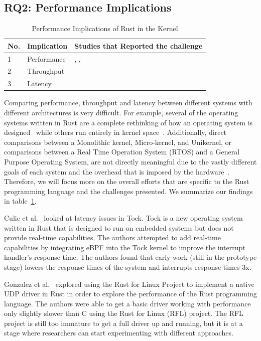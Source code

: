 \documentclass[sigconf]{acmart}
\begin{document}
\subsection{RQ2: Performance Implications}

\begin{table}
    \begin{tabular}{||l|l|l||}
    \hline
    No. & Implication & Studies that Reported the challenge\\
    \hline\hline
    1 & Performance & \cite{Gonzalez2023-ek}, \cite{Li2024-be}, \cite{Ma2023-ef}\\
    2 & Throughput & \cite{Gonzalez2023-ek}\\
    3 & Latency & \cite{Culic2022-bk} \\
    \hline
  \end{tabular}
  \caption{Performance Implications of Rust in the Kernel}
    \label{tab:RQ2}
\end{table}

Comparing performance, throughput and latency between different systems with different architectures is very difficult. For
example, several of the operating systems written in Rust are a complete rethinking of
how an operating system is designed~\cite{Boos2020-zh} while others run entirely in kernel space~\cite{Lankes2019-cm}. Additionally, direct comparisons between a Monolithic kernel, Micro-kernel, and Unikernel, or
comparisons between a Real Time Operation System (RTOS) and a General Purpose Operating System, are
not directly meaningful due to the vastly different goals of each system and the overhead that is imposed by the hardware~\cite{Arnott2012-fl}. Therefore, we will focus more on the overall efforts that are specific to the Rust programming language and the challenges
presented. We summarize our findings in table~\ref{tab:RQ2}.

Culic et al.~\cite{Culic2022-bk} looked at latency issues in Tock. Tock is a new operating
system written in Rust that is designed to run on embedded systems but does not provide real-time capabilities. The
authors attempted to add real-time capabilities by integrating eBPF into the Tock kernel to improve
the interrupt handler's response time. The authors found that early work (still in the prototype
stage) lowers the response times of the system and interrupts response times 3x.

Gonzalez et al.~\cite{Gonzalez2023-ek} explored using the Rust for Linux Project to implement a
native UDP driver in Rust in order to explore the performance of the Rust programming language. The
authors were able to get a basic driver working with performance only slightly slower than C using
the Rust for Linux (RFL) project. The RFL project is still too immature to get a full driver up and
running, but it is at a stage where researchers can start experimenting with different approaches.
\end{document}
